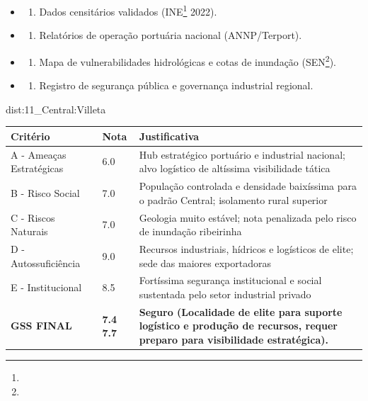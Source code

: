 {\begin{itemize}
\tightlist
\item
  \begin{enumerate}
  \def\labelenumi{\arabic{enumi})}
  \tightlist
  \item
    Dados censitários validados (INE\footnote{\fineINE} 2022).
  \end{enumerate}
\item
  \begin{enumerate}
  \def\labelenumi{\arabic{enumi})}
  \setcounter{enumi}{1}
  \tightlist
  \item
    Relatórios de operação portuária nacional (ANNP/\allowbreak Terport).
  \end{enumerate}
\item
  \begin{enumerate}
  \def\labelenumi{\arabic{enumi})}
  \setcounter{enumi}{2}
  \tightlist
  \item
    Mapa de vulnerabilidades hidrológicas e cotas de inundação (SEN\footnote{\fineSEN}).
  \end{enumerate}
\item
  \begin{enumerate}
  \def\labelenumi{\arabic{enumi})}
  \setcounter{enumi}{3}
  \tightlist
  \item
    Registro de segurança pública e governança industrial regional.
  \end{enumerate}
\end{itemize}}{dist:11_Central:Villeta}
\begin{table}[ht!]
\small \begin{tabular}{p{3.0cm}p{0.8cm}p{6.0cm}} \toprule
\textbf{Critério} & \textbf{Nota} & \textbf{Justificativa} \\ \midrule
A - Ameaças Estratégicas & 6.0 & Hub estratégico portuário e industrial nacional; alvo logístico de altíssima visibilidade tática \\
B - Risco Social & 7.0 & População controlada e densidade baixíssima para o padrão Central; isolamento rural superior \\
C - Riscos Naturais & 7.0 & Geologia muito estável; nota penalizada pelo risco de inundação ribeirinha \\
D - Autossuficiência & 9.0 & Recursos industriais, hídricos e logísticos de elite; sede das maiores exportadoras \\
E - Institucional & 8.5 & Fortíssima segurança institucional e social sustentada pelo setor industrial privado \\
\midrule \textbf{GSS FINAL} & \textbf{7.4
7.7} & \textbf{Seguro (Localidade de elite para suporte logístico e produção de recursos, requer preparo para visibilidade estratégica).} \\ \bottomrule \end{tabular}
\end{table}
